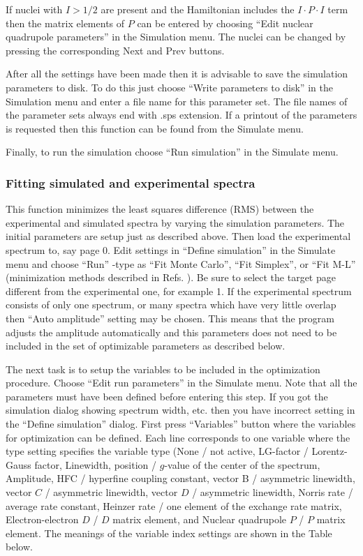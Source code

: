 \documentclass[byrevtex,amssymb,aps,pra,floatfix,letterpaper]{revtex4}
\begin{document}
If nuclei with $I > 1/2$ are present and the Hamiltonian includes the $I\cdot P\cdot I$ term then the matrix elements of $P$ can be entered by choosing ``Edit nuclear quadrupole parameters'' in the Simulation menu. The nuclei can be changed by pressing the corresponding Next and Prev buttons.

After all the settings have been made then it is advisable to save the simulation parameters to disk. To do this just choose ``Write parameters to disk'' in the Simulation menu and enter a file name for this parameter set. The file names of the parameter sets always end with .sps extension. If a printout of the parameters is requested then this function can be found from the Simulate menu.

Finally, to run the simulation choose ``Run simulation'' in the Simulate menu.

\subsubsection{Fitting simulated and experimental spectra}

This function minimizes the least squares difference (RMS) between the experimental and simulated spectra by varying the simulation parameters.
The initial parameters are setup just as described above. Then load the experimental spectrum to, say page 0. Edit settings in ``Define simulation'' in the Simulate menu and choose ``Run'' -type as ``Fit Monte Carlo'', ``Fit Simplex'', or ``Fit M-L'' (minimization methods described in Refs. \cite{kirste,mead}). Be sure to select the target page different from the experimental one, for example 1. If the experimental spectrum consists of only one spectrum, or many spectra which have very little overlap then ``Auto amplitude'' setting may be chosen. This means that the program adjusts the amplitude automatically and this parameters does not need to be included in the set of optimizable parameters as described below.

The next task is to setup the variables to be included in the optimization procedure. Choose ``Edit run parameters'' in the Simulate menu. Note that all the parameters must have been defined before entering this step. If you got the simulation dialog showing spectrum width, etc. then you have incorrect setting in the ``Define simulation'' dialog. First press ``Variables'' button where the variables for optimization can be defined. Each line corresponds to one variable where the type setting specifies the variable type (None / not active, LG-factor / Lorentz-Gauss factor, Linewidth, position / $g$-value of the center of the spectrum, Amplitude, HFC / hyperfine coupling constant, vector B / asymmetric linewidth, vector $C$ / asymmetric linewidth, vector $D$ / asymmetric linewidth, Norris rate / average rate constant, Heinzer rate / one element of the exchange rate matrix, Electron-electron $D$ / $D$ matrix element, and Nuclear quadrupole $P$ / $P$ matrix element. The meanings of the variable index settings are shown in the Table below.\\
\end{document}
